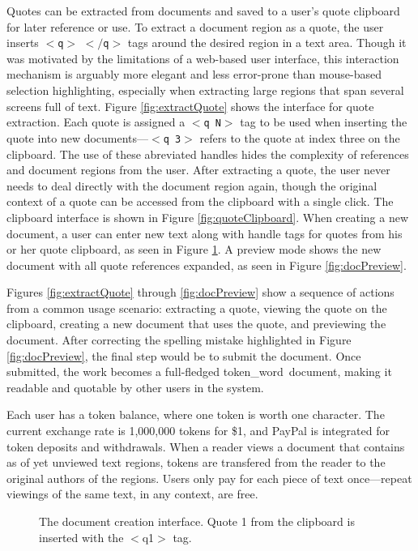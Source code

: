 \documentclass{acm_proc_article-sp}
\newcommand{\tokenWord}{token\_word}
\begin{document}
Quotes can be extracted from documents and saved to a user's quote clipboard for later reference or use.
To extract a document region as a quote, the user inserts $<$\texttt{q}$>$ $<$$/$\texttt{q}$>$ tags around the desired region in a text area.
Though it was motivated by the limitations of a web-based user interface, this interaction mechanism is arguably more elegant and less error-prone than mouse-based selection highlighting, especially when extracting large regions that span several screens full of text.
Figure \ref{fig:extractQuote} shows the interface for quote extraction. 
Each quote is assigned a $<$\texttt{q N}$>$ tag to be used when inserting the quote into new documents---$<$\texttt{q 3}$>$ refers to the quote at index three on the clipboard.
The use of these abreviated handles hides the complexity of references and document regions from the user.
After extracting a quote, the user never needs to deal directly with the document region again, though the original context of a quote can be accessed from the clipboard with a single click.
The clipboard interface is shown in Figure \ref{fig:quoteClipboard}.
When creating a new document, a user can enter new text along with handle tags for quotes from his or her quote clipboard, as seen in Figure \ref{fig:docCreate}.
A preview mode shows the new document with all quote references expanded, as seen in Figure \ref{fig:docPreview}.




Figures \ref{fig:extractQuote} through \ref{fig:docPreview} show a sequence of actions from a common usage scenario:  extracting a quote, viewing the quote on the clipboard, creating a new document that uses the quote, and previewing the document.
After correcting the spelling mistake highlighted in Figure \ref{fig:docPreview}, the final step would be to submit the document.
Once submitted, the work becomes a full-fledged \tokenWord \  document, making it readable and quotable by other users in the system.


Each user has a token balance, where one token is worth one character.
The current exchange rate is 1,000,000 tokens for \$1, and PayPal is integrated for token deposits and withdrawals.
When a reader views a document that contains as of yet unviewed text regions, tokens are transfered from the reader to the original authors of the regions.
Users only pay for each piece of text once---repeat viewings of the same text, in any context, are free.
\begin{figure}[t]
\centering
{}
\caption{The document creation interface. Quote 1 from the clipboard is inserted with the $<$q1$>$ tag.}
\label{fig:docCreate}
\end{figure}
\end{document}
